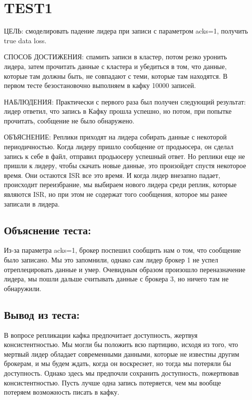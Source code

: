 \documentclass[11pt]{article}
\begin{document}
    \section*{TEST1}
    ЦЕЛЬ: смоделировать падение лидера при записи с параметром acks=1, получить true data loss.

    СПОСОБ ДОСТИЖЕНИЯ: спамить записи в кластер, потом резко уронить лидера, затем  прочитать данные с кластера и убедиться в том, что данные, которые там должны быть, не совпадают с теми, которые там находятся.
    В первом тесте безостановочно выполняем в кафку 10000 записей.

    НАБЛЮДЕНИЯ: Практически с первого раза был получен следующий результат: лидер ответил, что запись в Кафку прошла
    успешно, но потом, при попытке прочитать, сообщение не было обнаружено.

    ОБЪЯСНЕНИЕ: Реплики приходят на лидера собирать данные с некоторой периодичностью. Когда лидеру пришло сообщение
    от продьюсера, он сделал запись к себе в файл, отправил продьюсеру успешный ответ. Но реплики еще не пришли к
    лидеру, чтобы скачать новые данные, это произойдет спустя некоторое время. Они остаются ISR все это время. И
    когда лидер внезапно падает, происходит переизбрание, мы выбираем нового лидера среди реплик, которые являются ISR,
    но при этом не содержат того сообщения, которое мы ранее записали в лидера.

    \subsection{Объяснение теста:}
    Из-за параметра acks=1, брокер поспешил сообщить нам о том, что сообщение было записано. Мы это запомнили, однако
    сам лидер брокер 1 не успел отреплецировать данные и умер. Очевидным образом произошло переназначение лидера, мы пошли дальше считывать данные с брокера 3, но ничего там не обнаружили.
    \subsection{Вывод из теста:}
    В вопросе репликации кафка предпочитает доступность, жертвуя консистентностью. Мы могли бы положить всю партицию, исходя из того, что мертвый лидер обладает современными данными, которые не известны другим брокерам, и мы будем ждать, когда он воскреснет, но тогда мы потеряли бы доступность. Однако здесь мы предпочли сохранить доступность, пожертвовав консистентностью. Пусть лучше одна запись потеряется, чем мы вообще потеряем возможность писать в кафку.
    
\end{document}
